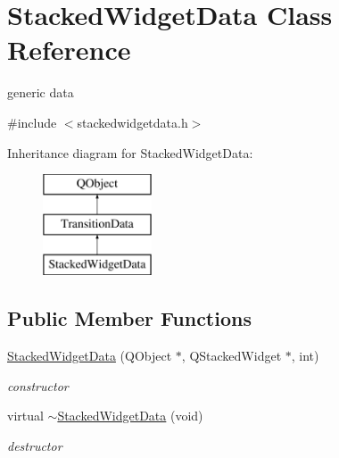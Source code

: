 \hypertarget{class_stacked_widget_data}{}\section{Stacked\+Widget\+Data Class Reference}
\label{class_stacked_widget_data}


generic data  




{\ttfamily \#include $<$stackedwidgetdata.\+h$>$}

Inheritance diagram for Stacked\+Widget\+Data\+:\begin{figure}[H]
\begin{center}
\leavevmode
\includegraphics[height=3.000000cm]{class_stacked_widget_data}
\end{center}
\end{figure}
\subsection*{Public Member Functions}
\begin{DoxyCompactItemize}
\item 
\mbox{\label{class_stacked_widget_data_a05b475722d0b2152e8830aefb99cc58a}} 
\hyperlink{class_stacked_widget_data_a05b475722d0b2152e8830aefb99cc58a}{Stacked\+Widget\+Data} (Q\+Object $\ast$, Q\+Stacked\+Widget $\ast$, int)
\begin{DoxyCompactList}\small\item\em constructor \end{DoxyCompactList}\item 
\mbox{\label{class_stacked_widget_data_abc9ccd1c0c248091a21926a19f105d3a}} 
virtual \hyperlink{class_stacked_widget_data_abc9ccd1c0c248091a21926a19f105d3a}{$\sim$\+Stacked\+Widget\+Data} (void)
\begin{DoxyCompactList}\small\item\em destructor \end{DoxyCompactList}\end{DoxyCompactItemize}
